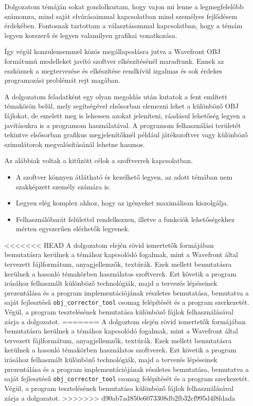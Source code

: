 
Dolgozatom témáján sokat gondolkoztam, hogy vajon mi lenne a legmegfelelőbb számomra, mind saját elvárásaimmal kapcsolatban mind személyes fejlődésem érdekében. Fontosnak tartottam a választásommal kapcsolatban, hogy a témám legyen korszerű és legyen valamilyen grafikai vonatkozása.

Így végül konzulensemmel közös megállapodásra jutva a Wavefront OBJ formátumú modelleket javító szoftver elkészítésénél maradtunk. Ennek az eszköznek a megtervezése és elkészítése rendkívül izgalmas és sok érdekes programozási problémát rejt magában.

A dolgozatom feladatként egy olyan megoldás után kutatok a fent említett témakörön belül, mely segítségével elsősorban elemezni lehet a különböző OBJ fájlokat, de emelett meg is lehessen azokat jeleníteni, ráadásul lehetőség legyen  a javításukra is a programom használatával. A programom felhasználási területét tekintve elsősorban grafikus megjelenítőknél például játékszoftver  vagy különböző szimulátorok megvalósításánál lehetne hasznos.

Az alábbiak voltak a kitűzött célok a szoftverrek kapcsolatban.
\begin{itemize}
\item A szoftver könnyen átlátható és kezelhető legyen, az adott témában nem szakképzett
személy számára is.
\item Legyen elég komplex ahhoz, hogy  az igényeket maximálisan kiszolgálja.
\item Felhasználóbarát felülettel rendelkezzen, illetve a funkciók lehetőségekhez mérten egyszerűen elérhetők legyenek.
\end{itemize}

<<<<<<< HEAD
A dolgozatom elején rövid ismertetők formájában bemutatásra kerülnek a témához kapcsolódó fogalmak, mint a Wavefront által tervezett fájlformátum, anyagjellemzők, textúrák. Ezek mellett bemutatásra kerülnek a hasonló témakörben használatos szoftverek. Ezt követik a program irásához felhasznált különböző technológiák, majd a tervezés lépéseinek prezentálása és a program implementációjának részletes bemutatása, bemutatva a saját fejlesztésű \texttt{obj\_corrector\_tool} csomag felépítését és a program szerkezetét. Végül, a program tesztelésének bemutatása különböző fájlok felhasználásával zárja a dolgozatot.
=======
A dolgoztom elején rövid ismertetők formájában bemutatásra kerülnek a témához kapcsolódó fogalmak, mint a Wavefront által tervezett fájlformátum, anyagjellemzők, textúrák. Ezek mellett bemutatásra kerülnek a hasonló témakörben használatos szoftverek. Ezt követik a program irásához felhasznált különböző technológiák, majd a tervezés lépéseinek prezentálása és a program implementációjának részletes bemutatása, bemutatva a saját fejlesztésű \texttt{obj\_corrector\_tool} csomag felépítését és a program szerkezetét. Végül, a program tesztelésének bemutatása különböző fájlok felhasználásával zárja a dolgozatot.
>>>>>>> d90ab7ad850e6073308db2fb32cf995d4f8fdada

